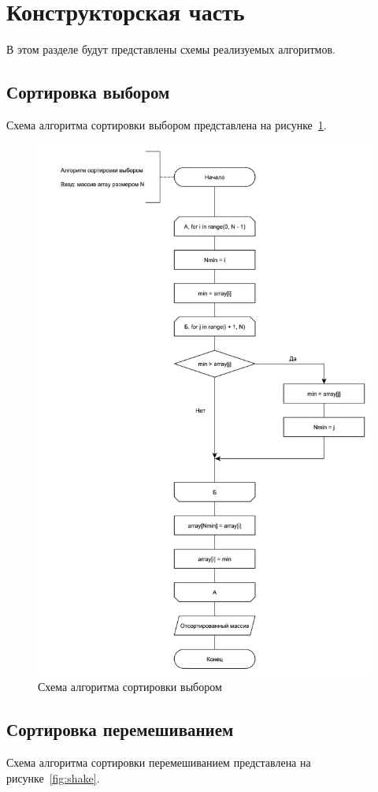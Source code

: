 \section{Конструкторская часть}

В этом разделе будут представлены схемы реализуемых алгоритмов.

\subsection{Сортировка выбором}

Схема алгоритма сортировки выбором представлена на рисунке~\ref{fig:choice}.

\begin{figure}
	\centering
	\includegraphics[width=0.7\linewidth]{images/choice}
	\caption{Схема алгоритма сортировки выбором}
	\label{fig:choice}
\end{figure}

\subsection{Сортировка перемешиванием}

Схема алгоритма сортировки перемешиванием представлена на рисунке~\ref{fig:shake}.

